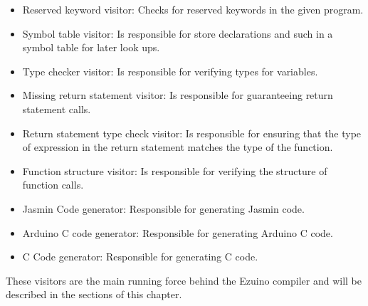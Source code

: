\begin{itemize}
    \setlength\itemsep{0.3em}
    \item Reserved keyword visitor: Checks for reserved keywords in the given program.
    \item Symbol table visitor: Is responsible for store declarations and such in a symbol table for later look ups.
    \item Type checker visitor: Is responsible for verifying types for variables.
    \item Missing return statement visitor: Is responsible for guaranteeing return statement calls.
    \item Return statement type check visitor: Is responsible for ensuring that the type of expression in the return statement matches the type of the function.
    \item Function structure visitor: Is responsible for verifying the structure of function calls.
    \item Jasmin Code generator: Responsible for generating Jasmin code.
    \item Arduino C code generator: Responsible for generating Arduino C code.
    \item C Code generator: Responsible for generating C code.
\end{itemize}
These visitors are the main running force behind the Ezuino compiler and will be described in the sections of this chapter.